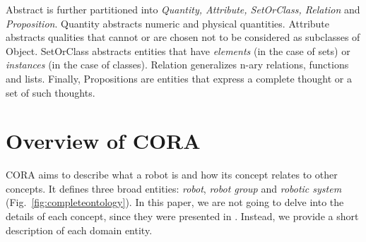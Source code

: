 \documentclass[preprint,12pt]{elsarticle}
\begin{document}
Abstract is further partitioned into \textit{Quantity, Attribute, SetOrClass, Relation} and \textit{Proposition}. Quantity abstracts numeric and physical quantities. Attribute abstracts qualities that cannot or are chosen not to be considered as subclasses of Object. SetOrClass abstracts entities that have \emph{elements} (in the case of sets) or \emph{instances} (in the case of classes). Relation generalizes n-ary relations, functions and lists. Finally, Propositions are entities that express a complete thought or a set of such thoughts. 



\section{Overview of CORA}  
\label{sec:CORA} 





CORA aims to describe what a robot is and how its concept relates to other concepts. It defines three broad entities: \emph{robot}, \emph{robot group} and \emph{robotic system} (Fig.~\ref{fig:completeontology}). In this paper, we are not going to delve into the details of each concept, since they were presented in \cite{prestes2013towards}. Instead, we provide a short description of each domain entity. 
\end{document}
